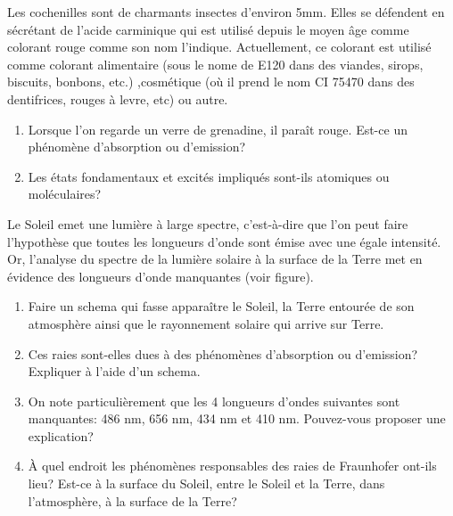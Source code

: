 Les cochenilles sont de charmants insectes d'environ 5mm.
Elles se défendent en sécrétant de l'acide carminique qui est utilisé depuis le moyen âge comme colorant
rouge comme son nom l'indique.
Actuellement, ce colorant est utilisé comme colorant alimentaire (sous le nome de E120 dans des viandes, sirops, biscuits, bonbons, etc.) ,cosmétique (où il prend le nom CI 75470 dans des dentifrices, rouges à levre, etc) ou autre.

\begin{enumerate}[\bf 1)]
	\item Lorsque l'on regarde un verre de grenadine, il paraît rouge.
		Est-ce un phénomène d'absorption ou d'emission?
	\item Les états fondamentaux et excités impliqués sont-ils atomiques ou moléculaires?
\end{enumerate}

Le Soleil emet une lumière à large spectre, c'est-à-dire que
l'on peut faire l'hypothèse que toutes les longueurs d'onde sont émise
avec une égale intensité.
Or, l'analyse du spectre de la lumière solaire à la surface de la Terre met en évidence
des longueurs d'onde manquantes (voir figure).
\begin{enumerate}[\bf 1)]
	\item Faire un schema qui fasse apparaître le Soleil, la Terre entourée de son atmosphère
		ainsi que le rayonnement solaire qui arrive sur Terre.
	\item Ces raies sont-elles dues à des phénomènes d'absorption ou d'emission?
		Expliquer à l'aide d'un schema.
	\item On note particulièrement que les 4 longueurs d'ondes suivantes sont manquantes:
		486 nm, 656 nm, 434 nm et 410 nm. Pouvez-vous proposer une explication?
	\item À quel endroit les phénomènes responsables des raies de Fraunhofer ont-ils lieu? Est-ce
		à la surface du Soleil, entre le Soleil et la Terre, dans l'atmosphère, à la surface
		de la Terre?

\end{enumerate}




